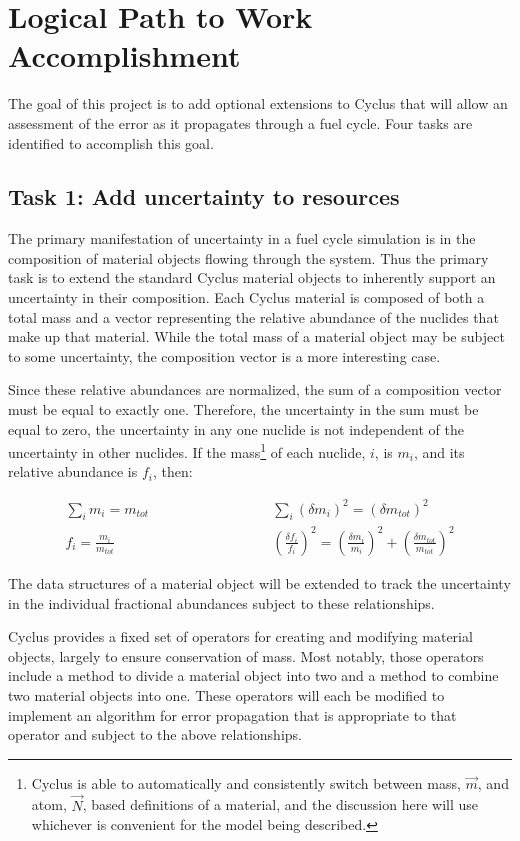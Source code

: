 \documentclass[dvips,12pt]{article}
\newcommand{\unc}[1]
{ \delta #1 }
\newcommand{\uncsq}[1]
{ \left(\unc{#1}\right)^2 }
\newcommand{\uncratio}[1]
{ \left(\frac{\unc{#1}}{#1}\right) }
\newcommand{\uncratiosq}[1]
{ \uncratio{#1}^2 }
\begin{document}
\section{Logical Path to Work Accomplishment}
The goal of this project is to add optional
extensions to Cyclus that will allow an assessment
of the error as it propagates through a fuel
cycle.  Four tasks are identified to accomplish
this goal.


\subsection{Task 1: Add uncertainty to resources}

The primary manifestation of uncertainty in a fuel
cycle simulation is in the composition of material
objects flowing through the system.  Thus the
primary task is to extend the standard Cyclus
material objects to inherently support an
uncertainty in their composition.  Each Cyclus
material is composed of both a total mass and a
vector representing the relative abundance of the
nuclides that make up that material.  While the
total mass of a material object may be subject to
some uncertainty, the composition vector is a more
interesting case.

Since these relative abundances are normalized,
the sum of a composition vector must be equal to
exactly one. Therefore, the uncertainty in the sum
must be equal to zero, the uncertainty in any one
nuclide is not independent of the uncertainty in
other nuclides.  If the mass\footnote{Cyclus 
is able to automatically and consistently switch
between mass, $\vec{m}$, and atom, $\vec{N}$, based
 definitions of a
material, and the discussion here will use 
whichever is convenient for the model being 
described.}
 of each nuclide, $i$,
is $m_i$, and its relative abundance is $f_i$,
then:

\begin{align*}
  \sum_i m_i = m_{tot} \qquad\qquad&\qquad\qquad  
       \sum_i \uncsq{m_i} = \uncsq{m_{tot}}\\
  f_i = \frac{m_i}{m_{tot}} \qquad\qquad&\qquad\qquad  
       \uncratiosq{f_i} = \uncratiosq{m_i} + \uncratiosq{m_{tot}}
\end{align*}

The data structures of a material object will be
extended to track the uncertainty in the
individual fractional abundances subject to these
relationships.

Cyclus provides a fixed set of operators for
creating and modifying material objects, largely
to ensure conservation of mass.  Most notably,
those operators include a method to divide a
material object into two and a method to combine
two material objects into one.  These operators
will each be modified to implement an algorithm
for error propagation that is appropriate to that
operator and subject to the above relationships.
\end{document}
